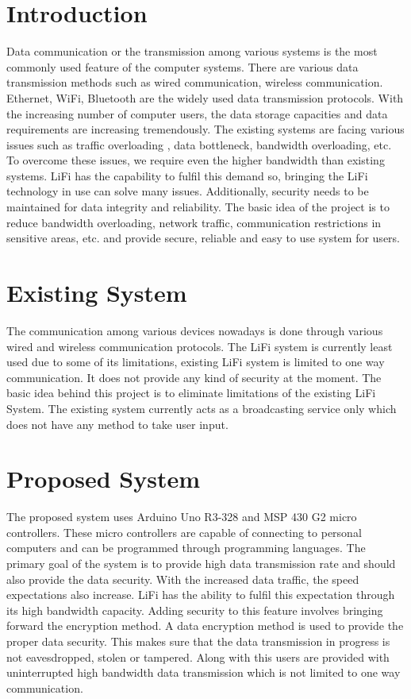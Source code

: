 \documentclass{ijcaArticle}
\begin{document}
\section{Introduction}

Data communication or the transmission among various systems is the most commonly used feature
of the computer systems. There are various data transmission methods such as wired communication,
wireless communication. Ethernet, WiFi, Bluetooth are the widely used data transmission protocols.
With the increasing number of computer users, the data storage capacities and data requirements are
increasing tremendously. The existing systems are facing various issues such as traffic overloading
, data bottleneck, bandwidth overloading, etc. To overcome these issues, we require even the higher
bandwidth than existing systems. LiFi has the capability to fulfil this demand so, bringing the LiFi
technology in use can solve many issues. Additionally, security needs to be maintained for data integrity
and reliability. The basic idea of the project is to reduce bandwidth overloading, network traffic,
communication restrictions in sensitive areas, etc. and provide secure, reliable and easy to use system
for users.



\section{Existing System}
\label{sec:documentclass}
The communication among various devices nowadays is done through various wired and wireless communication protocols. The LiFi system is currently least used due to some of its limitations, existing LiFi system is limited to one  way communication. It does not provide any kind of security at the moment. The basic idea behind this project is to eliminate limitations of the existing LiFi System. The existing system currently acts as a broadcasting service only which does not have any method to take user input.
\section{Proposed System}

The proposed system uses Arduino Uno R3-328 and MSP 430 G2 micro controllers. These micro
controllers are capable of connecting to personal computers and can be programmed through programming
languages. The primary goal of the system is to provide high data transmission rate and
should also provide the data security. With the increased data traffic, the speed expectations
also increase. LiFi has the ability to fulfil this expectation through its high bandwidth capacity.
Adding security to this feature involves bringing forward the encryption method. A data encryption method is used to provide the proper data security. This makes sure that the data transmission in progress is not eavesdropped, stolen or tampered. Along with this users are provided with uninterrupted high bandwidth data transmission which is not limited to one way communication. 
\end{document}
